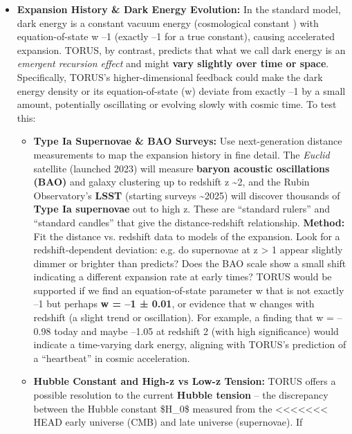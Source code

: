 \documentclass[]{article}
\begin{document}
\begin{itemize}
\item
  \textbf{Expansion History \& Dark Energy Evolution:} In the standard
  \LambdaCDM model, dark energy is a constant vacuum energy (cosmological
  constant \Lambda) with equation-of-state w \approx --1 (exactly --1 for a true
  constant), causing accelerated expansion. TORUS, by contrast, predicts
  that what we call dark energy is an \emph{emergent recursion effect}
  and might \textbf{vary slightly over time or space}​. Specifically,
  TORUS's higher-dimensional feedback could make the dark energy density
  or its equation-of-state (w) deviate from exactly --1 by a small
  amount, potentially oscillating or evolving slowly with cosmic time​.
  To test this:

  \begin{itemize}
  \item
    \textbf{Type Ia Supernovae \& BAO Surveys:} Use next-generation
    distance measurements to map the expansion history in fine detail.
    The \emph{Euclid} satellite (launched 2023) will measure
    \textbf{baryon acoustic oscillations (BAO)} and galaxy clustering up
    to redshift z \textasciitilde{}2, and the Rubin Observatory's
    \textbf{LSST} (starting surveys \textasciitilde{}2025) will discover
    thousands of \textbf{Type Ia supernovae} out to high z. These are
    ``standard rulers'' and ``standard candles'' that give the
    distance-redshift relationship. \textbf{Method:} Fit the distance
    vs. redshift data to models of the expansion. Look for a
    redshift-dependent deviation: e.g. do supernovae at z \textgreater{}
    1 appear slightly dimmer or brighter than \LambdaCDM predicts? Does the
    BAO scale show a small shift indicating a different expansion rate
    at early times? TORUS would be supported if we find an
    equation-of-state parameter w that is not exactly --1 but perhaps
    \textbf{w = --1 ± 0.01}, or evidence that w changes with redshift (a
    slight trend or oscillation)​. For example, a finding that w =
    --0.98 today and maybe --1.05 at redshift 2 (with high significance)
    would indicate a time-varying dark energy, aligning with TORUS's
    prediction of a ``heartbeat'' in cosmic acceleration​.
  \item
    \textbf{Hubble Constant and High-z vs Low-z Tension:} TORUS offers a
    possible resolution to the current \textbf{Hubble tension} -- the
    discrepancy between the Hubble constant \$H\_0\$ measured from the
<<<<<<< HEAD
    early universe (CMB) and late universe (supernovae)\hspace{0pt}. If

\end{itemize}
\end{itemize}
\end{document}
